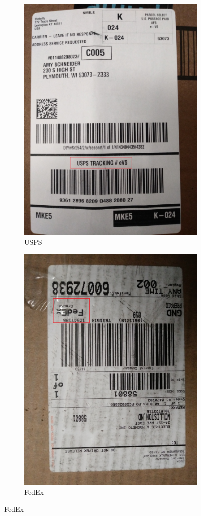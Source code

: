 \documentclass[12pt]{article}
\begin{document}
\begin{figure}[H]
\begin{subfigure}{0.5\textwidth}
\centering
\includegraphics[angle=90,width=0.7\linewidth]{20171221_153203}
\caption{USPS}
\end{subfigure}
\begin{subfigure}{0.5\textwidth}
\centering
\includegraphics[angle=90,width=0.7\linewidth]{20171221_183158}
\caption{FedEx}
\end{subfigure}
\end{figure}
\end{document}
